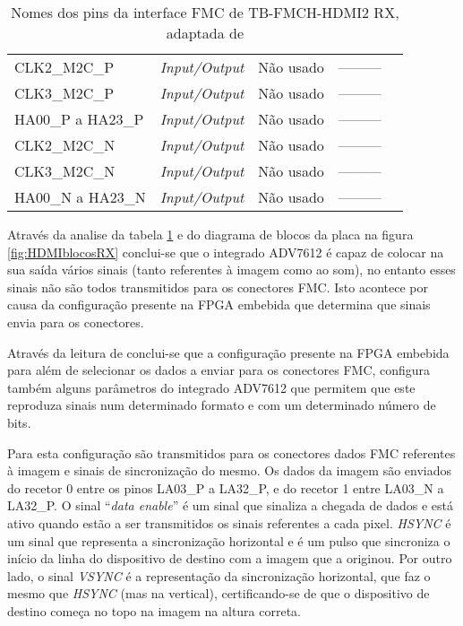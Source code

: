 \begin{table}[h!]
{\begin{tabular}{@{}lllll@{}}
			CLK2\_M2C\_P         & \textit{Input/Output}          & Não usado              & ---------                     \\ 
			CLK3\_M2C\_P         & \textit{Input/Output}          & Não usado              & ---------                     \\ 
			HA00\_P a HA23\_P    & \textit{Input/Output}          & Não usado              & ---------                     \\ 
			CLK2\_M2C\_N         & \textit{Input/Output}          & Não usado              & ---------                     \\ 
			CLK3\_M2C\_N         & \textit{Input/Output}          & Não usado              & ---------                     \\ 
			HA00\_N a HA23\_N    & \textit{Input/Output}          & Não usado              & ---------                     \\ \bottomrule	
		\end{tabular}}		
		\centering
		\caption{Nomes dos pins da interface FMC de TB-FMCH-HDMI2 RX, adaptada de \cite{R009}}
		\label{table:HDMIdataRX}
	\end{table}

Através da analise da tabela \ref{table:HDMIdataRX} e do diagrama de blocos da placa na figura \ref{fig:HDMIblocosRX} conclui-se que o integrado ADV7612 é capaz de colocar na sua saída vários sinais (tanto referentes à imagem como ao som), no entanto esses sinais não são todos transmitidos para os conectores FMC. Isto acontece por causa da configuração presente na FPGA embebida que determina que sinais envia para os conectores. 

Através da leitura de \cite{R016} conclui-se que a configuração presente na FPGA embebida para além de selecionar os dados a enviar para os conectores FMC, configura também alguns parâmetros do integrado ADV7612 que permitem que este reproduza sinais num determinado formato e com um determinado número de bits. 

Para esta configuração são transmitidos para os conectores dados FMC referentes à imagem e sinais de sincronização do mesmo. Os dados da imagem são enviados do recetor 0 entre os pinos LA03\_P a LA32\_P, e do recetor 1  entre LA03\_N a LA32\_P. O sinal “\textit{data enable}” é um sinal que sinaliza a chegada de dados e está ativo quando estão a ser transmitidos os sinais referentes a cada pixel. \textit{HSYNC} é um sinal que representa a sincronização horizontal e é um pulso que sincroniza o início da linha do dispositivo de destino com a imagem que a originou. Por outro lado, o sinal \textit{VSYNC} é a representação da sincronização horizontal, que faz o mesmo que \textit{HSYNC} (mas na vertical), certificando-se de que o dispositivo de destino começa no topo na imagem na altura correta.

